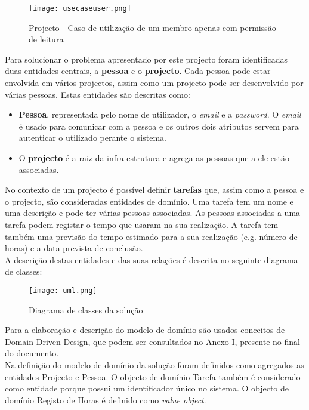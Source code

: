 \documentclass[]{article}
\begin{document}
\begin{figure}[h]
\texttt{[image: usecaseuser.png]}
\caption{Projecto - Caso de utilização de um membro apenas com permissão de leitura}
\label{usecaseuser}
\end{figure}

Para solucionar o problema apresentado por este projecto foram identificadas duas entidades centrais, a \textbf{pessoa} e o \textbf{projecto}. Cada pessoa pode estar envolvida em vários projectos, assim como um projecto pode ser desenvolvido por várias pessoas. Estas entidades são descritas como:
\begin{itemize}
\item
\textbf{Pessoa}, representada pelo nome de utilizador, o \emph{email} e a \emph{password}. O \emph{email} é usado para comunicar com a pessoa e os outros dois atributos servem para autenticar o utilizado perante o sistema.
\item
O \textbf{projecto} é a raiz da infra-estrutura e agrega as pessoas que a ele estão associadas.
\end{itemize}
No contexto de um projecto é possível definir \textbf{tarefas} que, assim como a pessoa e o projecto, são consideradas entidades de domínio. Uma tarefa tem um nome e uma descrição e pode ter várias pessoas associadas. As pessoas associadas a uma tarefa podem registar o tempo que usaram na sua realização. A tarefa tem também uma previsão do tempo estimado para a sua realização (e.g. número de horas) e a data prevista de conclusão.\\

A descrição destas entidades e das suas relações é descrita no seguinte diagrama de classes:
\begin{figure}[h]
\centering
\texttt{[image: uml.png]}
\caption{Diagrama de classes da solução}
\label{uml}
\end{figure}
\FloatBarrier

Para a elaboração e descrição do modelo de domínio são usados conceitos de Domain-Driven Design\cite{ddd}, que podem ser consultados no Anexo I, presente no final do documento.\\

Na definição do modelo de domínio da solução foram definidos como agregados as entidades Projecto e Pessoa. O objecto de domínio Tarefa também é considerado como entidade porque possui um identificador único no sistema. O objecto de domínio Registo de Horas é definido como \emph{value object}.\\
\end{document}
